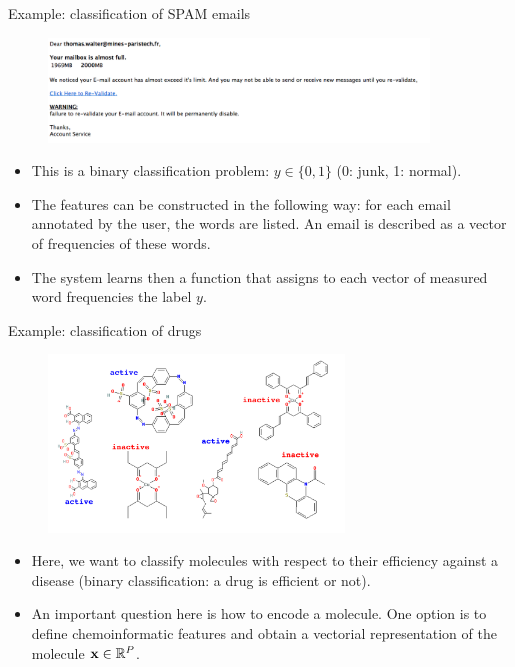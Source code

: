 \documentclass[xcolor=pdftex,dvipsnames,table]{beamer}
\begin{document}
\begin{frame}{Example: classification of SPAM emails}
\begin{figure}[htb]
\includegraphics[width=0.9\textwidth]{../graphics/SPAM_mail.png}
\end{figure}
\begin{itemize}
	\item This is a binary classification problem: $y \in \{0,1\}$ (0: junk, 1: normal). 
	\item The features can be constructed in the following way: for each email annotated by the user, the words are listed. An email is described as a vector of frequencies of these words. 
	\item The system learns then a function that assigns to each vector of measured word frequencies the label $y$. 
\end{itemize}
\end{frame}

\begin{frame}{Example: classification of drugs}
\begin{figure}[htb]
\includegraphics[width=0.7\textwidth]{../graphics/ml_example_drugs.pdf}
\end{figure}
\begin{itemize}
	\item Here, we want to classify molecules with respect to their efficiency against a disease (binary classification: a drug is efficient or not). 
	\item An important question here is how to encode a molecule. One option is to define chemoinformatic features and obtain a vectorial representation of the molecule $\mathbf{x} \in \mathbb{R}^{P}$. 
\end{itemize}
\end{frame}
\end{document}

